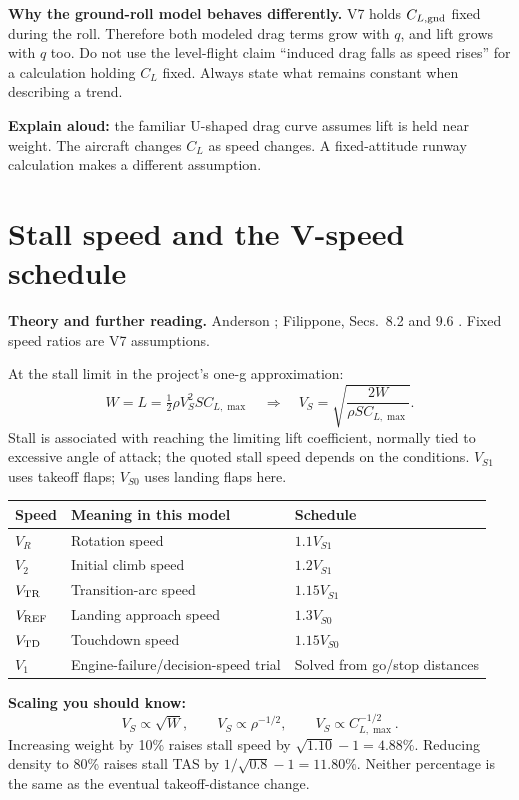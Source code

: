 \documentclass[11pt,letterpaper]{article}
\newcommand{\topic}[1]{\clearpage\section{#1}}
\newcommand{\reading}[1]{{\small\color{navy}\textbf{Theory and further reading.} #1\par}\vspace{3pt}}
\begin{document}
\textbf{Why the ground-roll model behaves differently.}
V7 holds $C_{L,\rm gnd}$ fixed during the roll. Therefore both modeled drag
terms grow with $q$, and lift grows with $q$ too. Do not use the level-flight
claim ``induced drag falls as speed rises'' for a calculation holding $C_L$
fixed. Always state what remains constant when describing a trend.

\begin{keyidea}
\textbf{Explain aloud:} the familiar U-shaped drag curve assumes lift is held
near weight. The aircraft changes $C_L$ as speed changes. A fixed-attitude
runway calculation makes a different assumption.
\end{keyidea}

\topic{Stall speed and the V-speed schedule}
\reading{Anderson \cite{anderson-performance}; Filippone, Secs.~8.2 and 9.6 \cite{filippone}. Fixed speed ratios are V7 assumptions.}
At the stall limit in the project's one-g approximation:
\[
W=L=\tfrac12\rho V_S^2SC_{L,\max}
\quad\Longrightarrow\quad
\boxed{V_S=\sqrt{\frac{2W}{\rho SC_{L,\max}}}}.
\]
Stall is associated with reaching the limiting lift coefficient, normally tied
to excessive angle of attack; the quoted stall speed depends on the conditions.
$V_{S1}$ uses takeoff flaps; $V_{S0}$ uses landing flaps here.

\par
\begin{tabularx}{\linewidth}{@{}lXl@{}}\toprule
Speed & Meaning in this model & Schedule\\\midrule
$V_R$ & Rotation speed & $1.1V_{S1}$\\
$V_2$ & Initial climb speed & $1.2V_{S1}$\\
$V_{\rm TR}$ & Transition-arc speed & $1.15V_{S1}$\\
$V_{\rm REF}$ & Landing approach speed & $1.3V_{S0}$\\
$V_{\rm TD}$ & Touchdown speed & $1.15V_{S0}$\\
$V_1$ & Engine-failure/decision-speed trial & Solved from go/stop distances\\\bottomrule
\end{tabularx}

\textbf{Scaling you should know:}
\[
V_S\propto\sqrt W,\qquad V_S\propto\rho^{-1/2},\qquad
V_S\propto C_{L,\max}^{-1/2}.
\]
Increasing weight by 10\% raises stall speed by $\sqrt{1.10}-1=4.88\%$.
Reducing density to 80\% raises stall TAS by $1/\sqrt{0.8}-1=11.80\%$.
Neither percentage is the same as the eventual takeoff-distance change.
\end{document}

